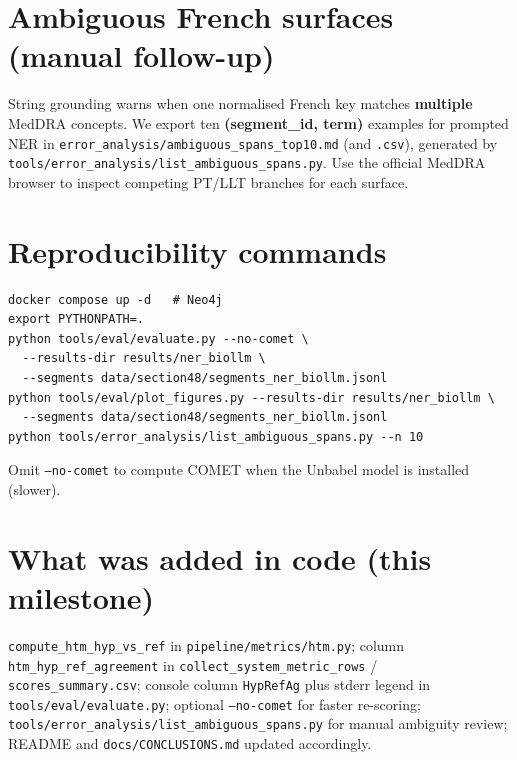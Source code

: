 \documentclass[11pt]{article}
\begin{document}
\section{Ambiguous French surfaces (manual follow-up)}
String grounding warns when one normalised French key matches \textbf{multiple} MedDRA concepts. We export ten \textbf{(segment\_id, term)} examples for prompted NER in \texttt{error\_analysis/ambiguous\_spans\_top10.md} (and \texttt{.csv}), generated by \texttt{tools/error\_analysis/list\_ambiguous\_spans.py}. Use the official MedDRA browser to inspect competing PT/LLT branches for each surface.

\section{Reproducibility commands}
\begin{verbatim}
docker compose up -d   # Neo4j
export PYTHONPATH=.
python tools/eval/evaluate.py --no-comet \
  --results-dir results/ner_biollm \
  --segments data/section48/segments_ner_biollm.jsonl
python tools/eval/plot_figures.py --results-dir results/ner_biollm \
  --segments data/section48/segments_ner_biollm.jsonl
python tools/error_analysis/list_ambiguous_spans.py --n 10
\end{verbatim}
\noindent Omit \texttt{--no-comet} to compute COMET when the Unbabel model is installed (slower).

\section{What was added in code (this milestone)}
\texttt{compute\_htm\_hyp\_vs\_ref} in \texttt{pipeline/metrics/htm.py}; column \texttt{htm\_hyp\_ref\_agreement} in \texttt{collect\_system\_metric\_rows} / \texttt{scores\_summary.csv}; console column \texttt{HypRefAg} plus stderr legend in \texttt{tools/eval/evaluate.py}; optional \texttt{--no-comet} for faster re-scoring; \texttt{tools/error\_analysis/list\_ambiguous\_spans.py} for manual ambiguity review; README and \texttt{docs/CONCLUSIONS.md} updated accordingly.
\end{document}
